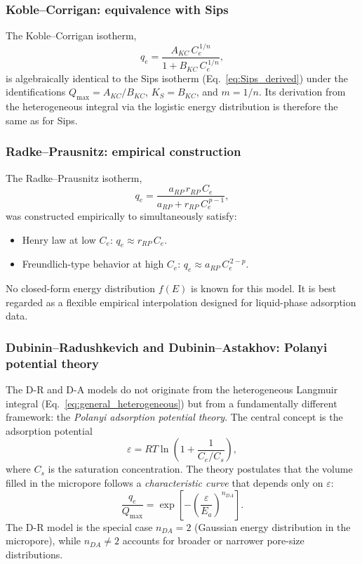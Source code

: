 	\subsubsection{Koble--Corrigan: equivalence with Sips}

	The Koble--Corrigan isotherm,
	\begin{equation}
		q_e = \frac{A_{KC}\, C_e^{\,1/n}}{1 + B_{KC}\, C_e^{\,1/n}},
	\end{equation}
	is algebraically identical to the Sips isotherm
	(Eq.~\eqref{eq:Sips_derived}) under the identifications
	$Q_{\max} = A_{KC}/B_{KC}$, $K_S = B_{KC}$, and $m = 1/n$.
	Its derivation from the heterogeneous integral via the logistic
	energy distribution is therefore the same as for Sips.

	\subsubsection{Radke--Prausnitz: empirical construction}

	The Radke--Prausnitz isotherm,
	\begin{equation}
		q_e = \frac{a_{RP}\, r_{RP}\, C_e}
		{a_{RP} + r_{RP}\, C_e^{\,p-1}},
	\end{equation}
	was constructed empirically to simultaneously satisfy:
	\begin{itemize}
		\item Henry law at low $C_e$: $q_e \approx r_{RP}\,C_e$.
		\item Freundlich-type behavior at high $C_e$:
		$q_e \approx a_{RP}\, C_e^{\,2-p}$.
	\end{itemize}
	No closed-form energy distribution $f(E)$ is known for this model.
	It is best regarded as a flexible empirical interpolation designed
	for liquid-phase adsorption data.

	\subsubsection{Dubinin--Radushkevich and Dubinin--Astakhov:
		Polanyi potential theory}

	The D-R and D-A models do not originate from the heterogeneous
	Langmuir integral (Eq.~\eqref{eq:general_heterogeneous}) but from
	a fundamentally different framework: the \emph{Polanyi adsorption
	potential theory}. The central concept is the adsorption potential
	\begin{equation}
		\varepsilon = RT\ln\!\left(1 + \frac{1}{C_e/C_s}\right),
		\label{eq:polanyi_potential}
	\end{equation}
	where $C_s$ is the saturation concentration.
	The theory postulates that the volume filled in the micropore
	follows a \emph{characteristic curve} that depends only on
	$\varepsilon$:
	\begin{equation}
		\frac{q_e}{Q_{\max}}
		= \exp\!\left[-\left(\frac{\varepsilon}{E_a}\right)^{n_{DA}}
		\right].
		\label{eq:DA_derived}
	\end{equation}
	The D-R model is the special case $n_{DA} = 2$ (Gaussian energy
	distribution in the micropore), while $n_{DA} \neq 2$ accounts for
	broader or narrower pore-size distributions.


